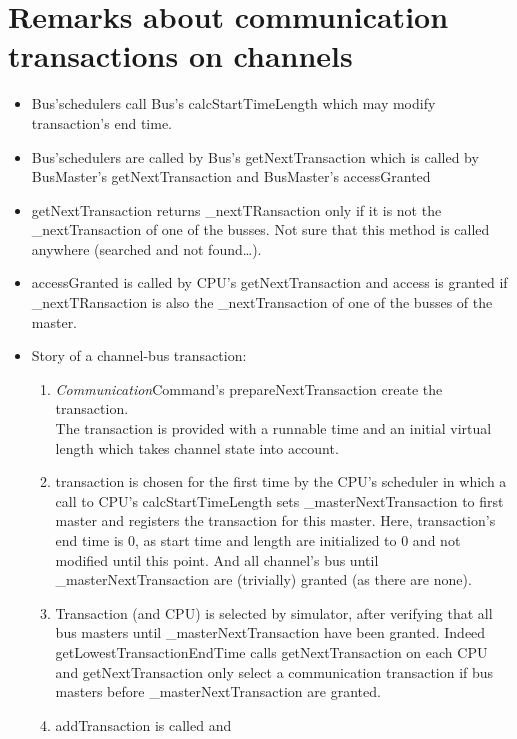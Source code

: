 \documentclass[a4paper,11pt]{article}
\newcommand{\cod}[1]{{\ttfamily #1}}
\begin{document}
\section*{Remarks about communication transactions on channels}
\begin{itemize}
	\item \cod{Bus}'schedulers call \cod{Bus}'s \cod{calcStartTimeLength} which may modify transaction's end time.
	\item \cod{Bus}'schedulers are called by \cod{Bus}'s \cod{getNextTransaction} which is called by \cod{BusMas\-ter}'s \cod{getNextTransaction} and \cod{BusMaster}'s \cod{accessGranted}
	\item \cod{getNextTransaction} returns \cod{\_nextTRansaction} only if it is not the \cod{\_next\-Trans\-ac\-tion} of one of the busses. Not sure that this method is called anywhere (searched and not found\ldots).
	\item \cod{accessGranted} is called by CPU's \cod{getNextTransaction} and access is granted if \cod{\_nextTRansaction} is also the \cod{\_nextTransaction} of one of the busses of the master.
	\item Story of a channel-bus transaction:
	  \begin{enumerate}
	  	\item \cod{\textit{Communication}Command}'s \cod{prepareNextTransaction} create the transaction.\\ The transaction is provided  with a runnable time and an initial virtual length which takes channel state into account.
	  	\item transaction is chosen for the first time by the \cod{CPU}'s scheduler in which a call to
	  	\cod{CPU}'s \cod{calcStartTimeLength} sets \cod{\_masterNextTransaction} to first master and registers the transaction for this master. Here, transaction's end time is 0, as start time and length are initialized to 0 and not modified until this point. And all channel's bus  until \cod{\_masterNextTrans\-action} are (trivially) granted (as there are none).
	  	\item  Transaction (and \cod{CPU}) is selected by simulator, after verifying that all bus masters until \cod{\_masterNextTransaction} have been granted. Indeed \cod{getLowest\-Transac\-tionEndTime} calls \cod{getNextTransaction} on each CPU and \cod{getNext\-Trans\-action} only select a communication transaction if bus masters before \cod{\_masterNext\-Trans\-action} are granted.
	  	\item \cod{addTransaction} is called and

\end{enumerate}
\end{itemize}
\end{document}
